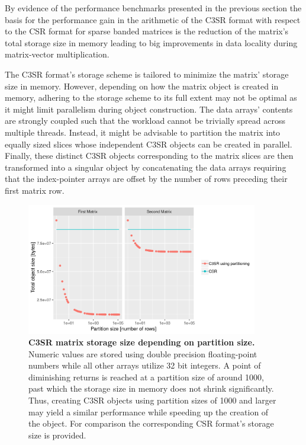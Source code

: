     By evidence of the performance benchmarks presented in the previous section the basis for the performance gain in the arithmetic of the C3SR format with respect to the CSR format for sparse banded matrices is the reduction of the matrix's total storage size in memory leading to big improvements in data locality during matrix-vector multiplication.

    The C3SR format's storage scheme is tailored to minimize the matrix' storage size in memory. However, depending on how the matrix object is created in memory, adhering to the storage scheme to its full extent may not be optimal as it might limit parallelism during object construction. The data arrays' contents are strongly coupled such that the workload cannot be trivially spread across multiple threads. Instead, it might be advisable to partition the matrix into equally sized slices whose independent C3SR objects can be created in parallel. Finally, these distinct C3SR objects corresponding to the matrix slices are then transformed into a singular object by concatenating the data arrays requiring that the index-pointer arrays are offset by the number of rows preceding their first matrix row.

    \begin{figure}[ht]
      \centering
      \includegraphics[width=0.9\textwidth]{assets/structured_grid_matrix_heap_size}
      \caption[C3SR matrix storage size depending on partition size.]{\textbf{C3SR matrix storage size depending on partition size.} Numeric values are stored using double precision floating-point numbers while all other arrays utilize 32 bit integers. A point of diminishing returns is reached at a partition size of around 1000, past which the storage size in memory does not shrink significantly. Thus, creating C3SR objects using partition sizes of 1000 and larger may yield a similar performance while speeding up the creation of the object. For comparison the corresponding CSR format's storage size is provided.}
      \label{fig:structured_grid_matrix_heap_size}
    \end{figure}

